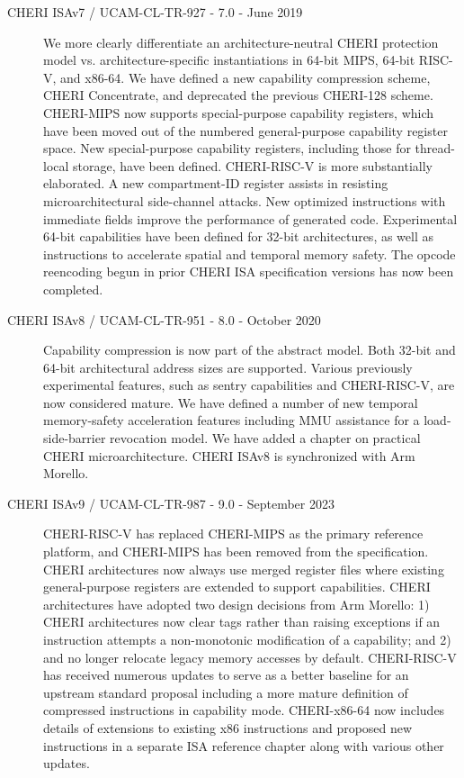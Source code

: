 \begin{description}
\item[CHERI ISAv7 / UCAM-CL-TR-927 - 7.0 - June 2019]
  We more clearly differentiate an archi\-tecture-neutral CHERI protection
  model vs. architecture-specific instantiations in 64-bit MIPS, 64-bit
  RISC-V, and x86-64.
  We have defined a new capability compression scheme, CHERI Concentrate, and
  deprecated the previous CHERI-128 scheme.
  CHERI-MIPS now supports special-purpose capability registers, which have
  been moved out of the numbered general-purpose capability register space.
  New special-purpose capability registers, including those for thread-local
  storage, have been defined.
  CHERI-RISC-V is more substantially elaborated.
  A new compartment-ID register assists in resisting microarchitectural
  side-channel attacks.
  New optimized instructions with immediate fields improve the performance of
  generated code.
  Experimental 64-bit capabilities have been defined for 32-bit architectures,
  as well as instructions to accelerate spatial and temporal memory safety.
  The opcode reencoding begun in prior CHERI ISA specification versions has
  now been completed.

\item[CHERI ISAv8 / UCAM-CL-TR-951 - 8.0 - October 2020]
  Capability compression is now part of the abstract model.
  Both 32-bit and 64-bit architectural address sizes are supported.
  Various previously experimental features, such as sentry capabilities and
  CHERI-RISC-V, are now considered mature. We have defined a number of new
  temporal memory-safety acceleration features including MMU assistance for a
  load-side-barrier revocation model.
  We have added a chapter on practical CHERI microarchitecture.
  CHERI ISAv8 is synchronized with Arm Morello.

\item[CHERI ISAv9 / UCAM-CL-TR-987 - 9.0 - September 2023]
  CHERI-RISC-V has replaced CHERI-MIPS as the primary reference
  platform, and CHERI-MIPS has been removed from the specification.
  CHERI architectures now always use merged register files where
  existing general-purpose registers are extended to support
  capabilities.
  CHERI architectures have adopted two design decisions from Arm
  Morello: 1) CHERI architectures now clear tags rather than raising
  exceptions if an instruction attempts a non-monotonic modification
  of a capability; and 2) \DDC{} and \PCC{} no longer relocate legacy
  memory accesses by default.
  CHERI-RISC-V has received numerous updates to serve as a better
  baseline for an upstream standard proposal including a more mature
  definition of compressed instructions in capability mode.
  CHERI-x86-64 now includes details of extensions to existing x86
  instructions and proposed new instructions in a separate ISA
  reference chapter along with various other updates.

\end{description}

